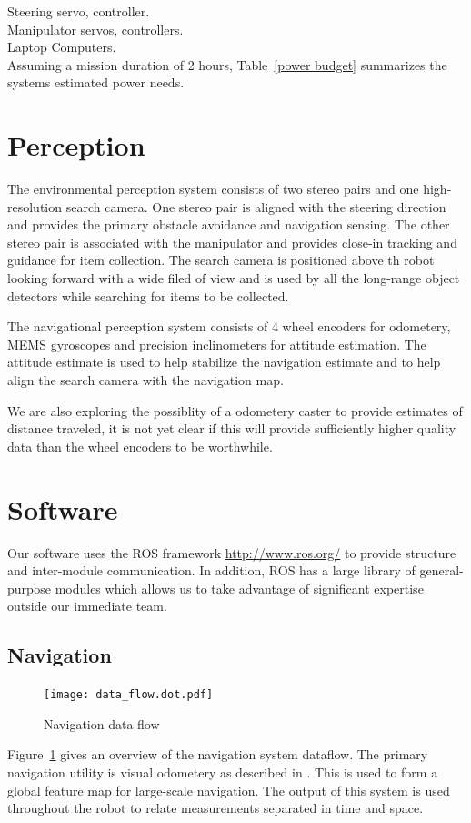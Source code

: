 \documentclass[12pt]{article}
\begin{document}
Steering servo, controller.\\

Manipulator servos, controllers.\\

Laptop Computers.\\

Assuming a mission duration of 2 hours, Table~\ref{power budget} summarizes the systems estimated power needs.



\section{Perception}\label{Perception}
The environmental perception system consists of two stereo pairs and one high-resolution search camera. One stereo pair is aligned with the steering direction and provides the primary obstacle avoidance and navigation sensing. The other stereo pair is associated with the manipulator and provides close-in tracking and guidance for item collection. The search camera is positioned above th robot looking forward with a wide filed of view and is used by all the long-range object detectors while searching for items to be collected.

The navigational perception system consists of 4 wheel encoders for odometery, MEMS gyroscopes and precision inclinometers for attitude estimation. The attitude estimate is used to help stabilize the navigation estimate and to help align the search camera with the navigation map.

We are also exploring the possiblity of a odometery caster to provide estimates of distance traveled, it is not yet clear if this will provide sufficiently higher quality data than the wheel encoders to be worthwhile.

\section{Software}\label{Software}
Our software uses the ROS framework \url{http://www.ros.org/} to provide structure and inter-module communication. In addition, ROS has a large library of general-purpose modules which allows us to take advantage of significant expertise outside our immediate team.

\subsection{Navigation}\label{Navigation}
\begin{figure}[htbp]
\centering
\texttt{[image: data\_flow.dot.pdf]}
\caption{Navigation data flow}
\label{fig_df_nav}
\end{figure}
Figure~\ref{fig_df_nav} gives an overview of the navigation system dataflow. The primary navigation utility is visual odometery as described in \cite{KKonoLSVO}. This is used to form a global feature map for large-scale navigation. The output of this system is used throughout the robot to relate measurements separated in time and space.
\end{document}
